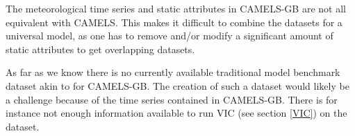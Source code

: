 The meteorological time series and static attributes in CAMELS-GB are 
not all equivalent with CAMELS. This makes it difficult to combine the datasets
for a universal model, as one has to remove and/or modify a significant amount of 
static attributes to get overlapping datasets.
 
As far as we know there is no currently available traditional model benchmark dataset 
akin to \cite{CAMELS_hydroshare} for CAMELS-GB. The creation of such a dataset would 
likely be a challenge because of the time series contained in CAMELS-GB. There is for 
instance not enough information available to run VIC (see section \ref{VIC}) on 
the dataset.
